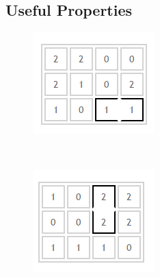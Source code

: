 \documentclass[12pt]{article}
\begin{document}
\subsection*{Useful Properties}
	\begin{figure}[h]
		\centering
		\begin{minipage}[b]{0.3\textwidth}
			\includegraphics[width=\textwidth]{fig_forced_location}
			\caption[Caption for the list of figures]{}
			\label{fig:forced_location}
		\end{minipage}
		~
		\begin{minipage}[b]{0.3\textwidth}
			\includegraphics[width=\textwidth]{fig_invalid_circling}
			\caption[Caption for the list of figures]{}
			\label{fig:invalid_circling}
		\end{minipage}
	\end{figure}
\end{document}
